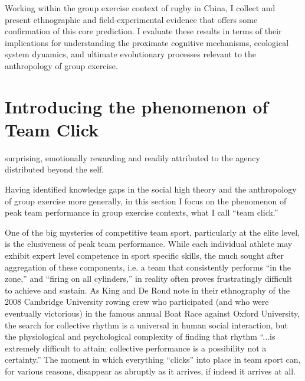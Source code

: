 \begin{CJK}{UTF8}{gbsn}
  Working within the group exercise context of rugby in China, I collect and present ethnographic and field-experimental evidence that offers some confirmation of this core prediction.  I evaluate these results in terms of their implications for understanding the proximate cognitive mechanisms, ecological system dynamics, and ultimate evolutionary processes relevant to the anthropology of group exercise.

















\section{Introducing the phenomenon of Team Click\label{sect:teamClickIntro}}


surprising, emotionally rewarding and readily attributed to the agency distributed beyond the self.

Having identified knowledge gaps in the social high theory and the anthropology of group exercise more generally, in this section I focus on the phenomenon of peak team performance in group exercise contexts, what I call ``team click.''

One of the big mysteries of competitive team sport, particularly at the elite level, is the elusiveness of peak team performance.  While each individual athlete may exhibit expert level competence in sport specific skills, the much sought after aggregation of these components, i.e. a team that consistently performs ``in the zone,'' and ``firing on all cylinders,'' in reality often proves frustratingly difficult to achieve and sustain.  As King and De Rond \textcite[568]{King2011} note in their ethnography of the 2008 Cambridge University rowing crew who participated (and who were eventually victorious) in the famous annual Boat Race against Oxford University, the search for collective rhythm is a universal in human social interaction, but  the physiological and psychological complexity of finding that rhythm ``...is extremely difficult to attain; collective performance is a possibility not a certainty.''   The moment in which everything ``clicks'' into place in team sport can, for various reasons, disappear as abruptly as it arrives, if indeed it arrives at all.


\end{CJK}
